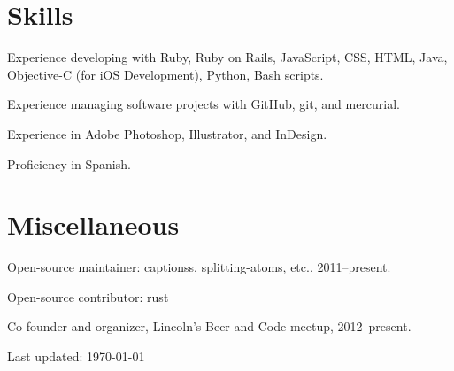 \documentclass[10pt,letterpaper]{article}
\renewenvironment{itemize}{
  \begin{list}{}{
    \setlength{\leftmargin}{1.5em}
    \setlength{\itemsep}{0.25em}
    \setlength{\parskip}{0pt}
    \setlength{\parsep}{0.25em}
  }
}{
  \end{list}
}
\begin{document}
\section*{Skills}

\begin{itemize}
    \item Experience developing with Ruby, Ruby on Rails, JavaScript, CSS, HTML, Java,
    Objective-C (for iOS Development), Python, Bash scripts.
    \item Experience managing software projects with GitHub, git, and mercurial.
    \item Experience in Adobe Photoshop, Illustrator, and InDesign.
    \item Proficiency in Spanish.
\end{itemize}

\section*{Miscellaneous}

\begin{itemize}
    \item Open-source maintainer: captionss, splitting-atoms, etc., 2011--present.
    \item Open-source contributor: rust
    \item Co-founder and organizer, Lincoln's Beer and Code meetup, 2012--present.
\end{itemize}

\bigskip

\begin{center}
  \begin{small}
    Last updated: \today
  \end{small}
\end{center}
\end{document}
